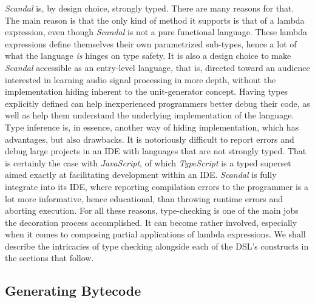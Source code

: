 \emph{Scandal} is, by design choice, strongly typed. There are many reasons for that. The main reason is that the only kind of method it supports is that of a lambda expression, even though \emph{Scandal} is not a pure functional language. These lambda expressions define themselves their own parametrized sub-types, hence a lot of what the language \emph{is} hinges on type safety. It is also a design choice to make \emph{Scandal} accessible as an entry-level language, that is, directed toward an audience interested in learning audio signal processing in more depth, without the implementation hiding inherent to the unit-generator concept. Having types explicitly defined can help inexperienced programmers better debug their code, as well as help them understand the underlying implementation of the language. Type inference is, in essence, another way of hiding implementation, which has advantages, but also drawbacks. It is notoriously difficult to report errors and debug large projects in an IDE with languages that are not strongly typed. That is certainly the case with \emph{JavaScript}, of which \emph{TypeScript} is a typed superset aimed exactly at facilitating development within an IDE. \emph{Scandal} is fully integrate into its IDE, where reporting compilation errors to the programmer is a lot more informative, hence educational, than throwing runtime errors and aborting execution. For all these reasons, type-checking is one of the main jobs the decoration process accomplished. It can become rather involved, especially when it comes to composing partial applications of lambda expressions. We shall describe the intricacies of type checking alongside each of the DSL's constructs in the sections that follow.

\subsection{Generating Bytecode}

